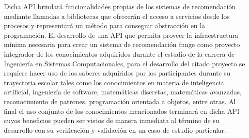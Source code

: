 	Dicha API brindará funcionalidades propias de los sistemas de recomendación mediante llamadas a bibliotecas que ofrecerán el acceso a servicios desde los procesos y representará un método para conseguir abstracción en la programación. El desarrollo de una API que permita proveer la infraestructura mínima necesaria para crear un sistema de recomendación funge como proyecto integrador de los conocimientos adquiridos durante el estudio de la carrera de Ingeniería en Sistemas Computacionales, para el desarrollo del citado proyecto se requiere hacer uso de los saberes adquiridos por los participantes durante su trayectoria escolar tales como los conocimientos en materia de inteligencia artificial, ingeniería de software, matemáticas discretas, matemáticas avanzadas, reconocimiento de patrones, programación orientada a objetos, entre otras. Al final el uso conjunto de los conocimientos mencionados terminará en dicha API cuyos beneficios pueden ser vistos de manera inmediata al término de su desarrollo con su verificación y validación en un caso de estudio particular.
